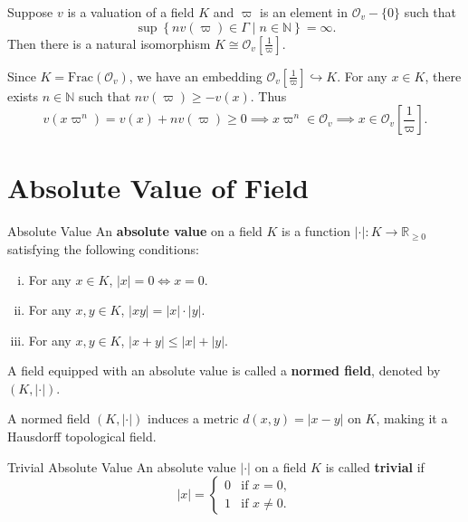 \begin{proposition}{}{}
    Suppose $v$ is a valuation of a field $K$ and $\varpi$ is an element in $\mathcal{O}_v-\{0\}$ such that 
    $$
    \sup\left\{n v\left(\varpi\right)\in \Gamma\mid n\in\mathbb{N}\right\}=\infty.
    $$
    Then there is a natural isomorphism $K\cong \mathcal{O}_v\left[\frac{1}{\varpi}\right]$.
\end{proposition}

\begin{prf}
    Since $K=\mathrm{Frac}(\mathcal{O}_v)$, we have an embedding $\mathcal{O}_v\left[\frac{1}{\varpi}\right]\hookrightarrow K$. For any $x\in K$, there exists $n\in \mathbb{N}$ such that $nv(\varpi)\ge -v(x)$. Thus
    \[
    v(x\varpi^n)= v(x)+nv(\varpi)\ge 0\implies x\varpi^n\in \mathcal{O}_v\implies x\in \mathcal{O}_v\left[\frac{1}{\varpi}\right].
    \]
\end{prf}

\section{Absolute Value of Field}

\begin{definition}{Absolute Value}{}
    An \textbf{absolute value} on a field \( K \) is a function \( |\cdot| : K \to \mathbb{R}_{\geq 0} \) satisfying the following conditions:

\begin{enumerate}[(i)]
    \item For any \( x \in K \), \( |x| = 0 \iff x = 0 \).
    \item For any \( x, y \in K \), \( |xy| = |x| \cdot |y| \).
    \item For any \( x, y \in K \), \( |x + y| \leq |x| + |y| \).
\end{enumerate}

A field equipped with an absolute value is called a \textbf{normed field}, denoted by \( (K, |\cdot|) \). 
\end{definition}

A normed field $(K, |\cdot|)$ induces a metric $d(x, y) = |x - y|$ on $K$, making it a Hausdorff topological field. 

\begin{definition}{Trivial Absolute Value}{}
    An absolute value $|\cdot|$ on a field $K$ is called \textbf{trivial} if 
    \[
|x| = \begin{cases}
    0 & \text{if } x = 0, \\
    1 & \text{if } x \neq 0.
\end{cases}
\]
    
\end{definition}


